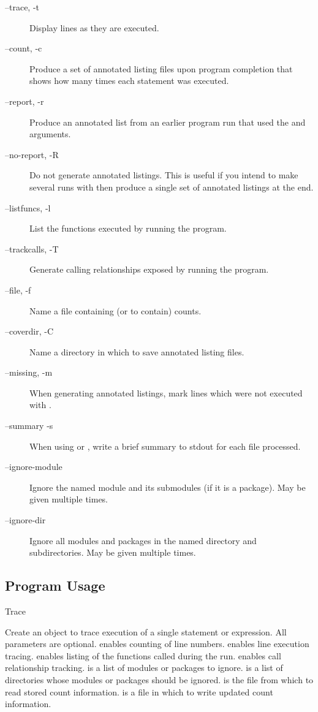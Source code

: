 \begin{description}
\item[--trace, -t]{Display lines as they are executed.}
\item[--count, -c]{Produce a set of  annotated listing files upon program
completion that shows how many times each statement was executed.}
\item[--report, -r]{Produce an annotated list from an earlier program run that
used the  and  arguments.}
\item[--no-report, -R]{Do not generate annotated listings.  This is useful
if you intend to make several runs with  then produce a single
set of annotated listings at the end.}
\item[--listfuncs, -l]{List the functions executed by running the program.}
\item[--trackcalls, -T]{Generate calling relationships exposed by running the
program.}
\item[--file, -f]{Name a file containing (or to contain) counts.}
\item[--coverdir, -C]{Name a directory in which to save annotated listing
files.}
\item[--missing, -m]{When generating annotated listings, mark lines which
were not executed with \code{>>>>>>}.}
\item[--summary -s]{When using  or , write a
brief summary to stdout for each file processed.}
\item[--ignore-module]{Ignore the named module and its submodules (if it is
a package).  May be given multiple times.}
\item[--ignore-dir]{Ignore all modules and packages in the named directory
and subdirectories.  May be given multiple times.}
\end{description}

\subsection{Program Usage}

\begin{classdesc}{Trace}{}

Create an object to trace execution of a single statement or expression.
All parameters are optional.   enables counting of line numbers.
 enables line execution tracing.   enables
listing of the functions called during the run.   enables
call relationship tracking.   is a list of modules or
packages to ignore.   is a list of directories whose modules
or packages should be ignored.   is the file from which to read
stored count information.   is a file in which to write updated
count information.

\end{classdesc}

